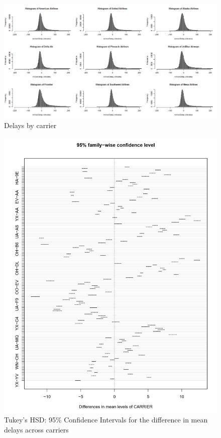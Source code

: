 \documentclass[12pt, a4paper, openany]{book}
\begin{document}
			\begin{figure}[h]
			\centering
	 		\includegraphics[width = 1\textwidth]{../figures/PLOTS FOR REPORT/Chapter 4/Figure 4.5}
	 		\caption{Delays by carrier}
	 		\end{figure}

			\begin{figure}[h]
			\centering
	 		\includegraphics[width = .9 \textwidth]{../figures/PLOTS FOR REPORT/Chapter 4/Figure 4.6}
	 		\caption{Tukey's HSD: 95\% Confidence Intervals for the difference in mean delays across carriers}
	 		\end{figure}
\end{document}
